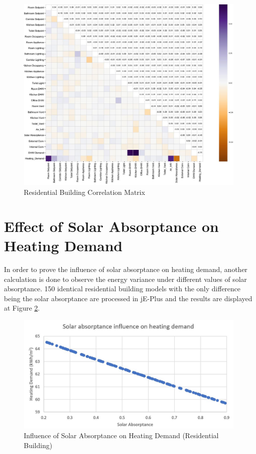 \documentclass[a4paper, oneside]{discothesis}
\begin{document}
	    \begin{figure}[H]
		\centering
		\includegraphics[scale=0.6]{Hongger_Matrix.jpg}
		\caption{Residential Building Correlation Matrix}
		\label{fig:Hongg_Matrix}
		\end{figure}


  	
    \section{Effect of Solar Absorptance on Heating Demand}
			In order to prove the influence of solar absorptance on heating demand, another calculation is done to observe the energy variance under different values of solar absorptance. 150 identical residential building models with the only difference being the solar absorptance are processed in jE-Plus and the results are displayed at Figure \ref{fig:Hongg_solar}.\\
			
    	    \begin{figure}[htbp]
    		\centering
    		\includegraphics[scale=0.5]{Solar_HeatingDemand.JPG}
    		\caption{Influence of Solar Absorptance on Heating Demand (Residential Building)}
    		\label{fig:Hongg_solar}
    		\end{figure}			
        
\end{document}

